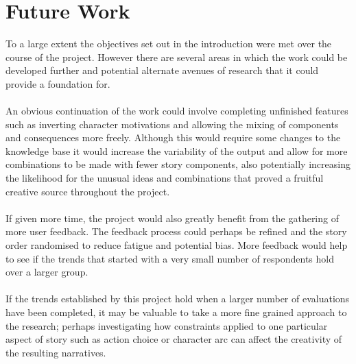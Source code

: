 \documentclass[letterpaper]{article}
\begin{document}
\section{Future Work}
To a large extent the objectives set out in the introduction were met over the course of the project. However there are several areas in which the work could be developed further and potential alternate avenues of research that it could provide a foundation for.\\
\\An obvious continuation of the work could involve completing unfinished features such as inverting character motivations and allowing the mixing of components and consequences more freely. Although this would require some changes to the knowledge base it would increase the variability of the output and allow for more combinations to be made with fewer story components, also potentially increasing the likelihood for the unusual ideas and combinations that proved a fruitful creative source throughout the project.\\
\\If given more time, the project would also greatly benefit from the gathering of more user feedback. The feedback process could perhaps be refined and the story order randomised to reduce fatigue and potential bias. More feedback would help to see if the trends that started with a very small number of respondents hold over a larger group.\\
\\If the trends established by this project hold when a larger number of evaluations have been completed, it may be valuable to take a more fine grained approach to the research; perhaps investigating how constraints applied to one particular aspect of story such as action choice or character arc can affect the creativity of the resulting narratives.\\

\end{document}
